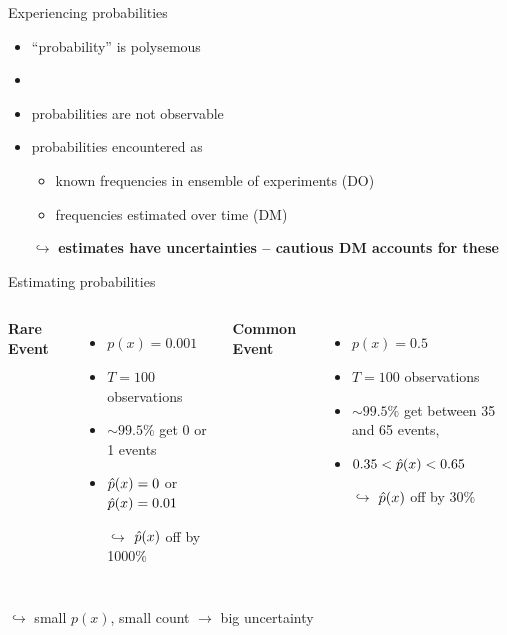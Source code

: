 \begin{frame}{Experiencing probabilities}

\begin{itemize}
 \item ``probability'' is polysemous
 \item {}
  \item probabilities are not observable
  \item probabilities encountered as
  	\begin{itemize}
  		\item known frequencies in ensemble of experiments (DO)
  		\item frequencies estimated over time (DM)
  	\end{itemize}
  \item[$\hookrightarrow$] \textbf{estimates have uncertainties -- cautious DM accounts for these}

\end{itemize}
\end{frame}


\begin{frame}{Estimating probabilities}
\begin{columns}[T]
\textbf{Rare Event} %
\begin{itemize}
  \item $p(x) = 0.001$
  \item $T=\num{100}$ observations
  \item $\sim 99.5\%$ get 0 or 1 events
  \item $\hat{p}(x) = 0$ or $\hat{p}(x)=0.01$
  \item[$\hookrightarrow$] $\hat{p}(x)$ off by \num{1000}\% 
\end{itemize}
\textbf{Common Event} %
\begin{itemize}
  \item $p(x)=0.5$
  \item $T= \num{100}$ observations
  \item $\sim 99.5\%$ get between 35 and 65 events,
  \item $0.35< \hat{p}(x) <0.65$
  \item[$\hookrightarrow$] $\hat{p}(x)$ off by 30\%
\end{itemize}
\end{columns}
\vspace{2em}
 \centering
$\hookrightarrow$ small $p(x)$, small count $\rightarrow$ big uncertainty
\end{frame}


